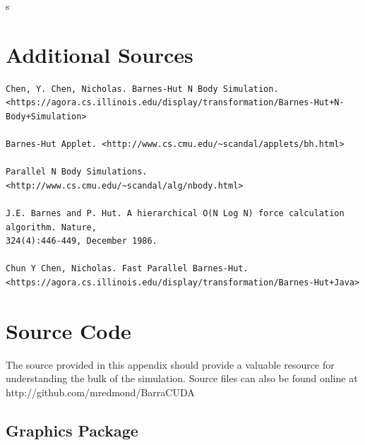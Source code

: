 s\documentclass[10pt]{article}
\begin{document}
\clearpage
\section{Additional Sources}
\begin{verbatim}
Chen, Y. Chen, Nicholas. Barnes-Hut N Body Simulation. 
<https://agora.cs.illinois.edu/display/transformation/Barnes-Hut+N-Body+Simulation>

Barnes-Hut Applet. <http://www.cs.cmu.edu/~scandal/applets/bh.html>

Parallel N Body Simulations. <http://www.cs.cmu.edu/~scandal/alg/nbody.html>

J.E. Barnes and P. Hut. A hierarchical O(N Log N) force calculation algorithm. Nature,
324(4):446-449, December 1986.

Chun Y Chen, Nicholas. Fast Parallel Barnes-Hut.
<https://agora.cs.illinois.edu/display/transformation/Barnes-Hut+Java>
\end{verbatim}

\clearpage
\appendix
\section{Source Code}
The source provided in this appendix should provide a valuable resource for understanding the bulk of the simulation. Source files can also be found online at http://github.com/mredmond/BarraCUDA

\subsection{Graphics Package}
\end{document}
